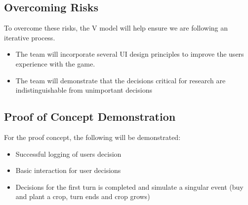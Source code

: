 \documentclass{article}
\begin{document}
\subsection{Overcoming Risks}
To overcome these risks, the V model will help ensure we are following an iterative process.
\begin{itemize}
    \item The team will incorporate several UI design principles to improve the users experience with the game.
    \item The team will demonstrate that the decisions critical for research are indistinguishable from unimportant decisions
\end{itemize}

\subsection{Proof of Concept Demonstration}
For the proof concept, the following will be demonstrated:
\begin{itemize}
    \item Successful logging of users decision
    \item Basic interaction for user decisions
    \item Decisions for the first turn is completed and simulate a singular event (buy and plant a crop, turn ends and crop grows)
\end{itemize}
\end{document}
